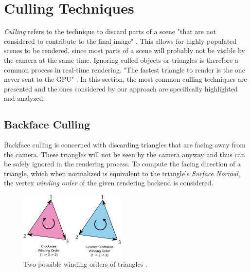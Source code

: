 \section{Culling Techniques} \label{sec-culling-techniques}

\emph{Culling} refers to the technique to discard parts of a scene "that are not considered to contribute to the final 
image" \cite{AkenineMoeller2018}. This allows for highly populated scenes to be rendered, since most parts of a scene 
will probably not be visible by the camera at the same time. Ignoring culled objects or triangles is therefore a common 
process in real-time rendering. "The fastest triangle to render is the one never sent to the \ac{GPU}" 
\cite{AkenineMoeller2018}. In this section, the most common culling techniques are presented and the ones considered by 
our approach are specifically highlighted and analyzed. 


\subsection*{Backface Culling} \label{subsec-backface-culling}

Backface culling is concerned with discarding triangles that are facing away from the camera. 
These triangles will not be seen by the camera anyway and thus can be safely ignored in the rendering process. 
To compute the facing direction of a triangle, which when normalized is equivalent to the triangle's 
\emph{Surface Normal}, the vertex \emph{winding order} of the given rendering backend is considered.

\begin{figure}[h]
    \centering
    \includegraphics[width=200px]{images/graphics/winding-order-triangle.png}
    \caption{Two possible winding orders of triangles \cite{Michel2016}.}
    \label{fig:triangle-winding-order}
\end{figure}

